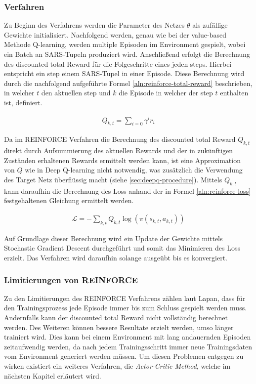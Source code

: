 \documentclass[11pt]{scrartcl}
\begin{document}
\subsubsection{Verfahren}
Zu Beginn des Verfahrens werden die Parameter des Netzes $\theta$ als zufällige Gewichte
initialisiert. Nachfolgend werden, genau wie bei der value-based Methode Q-learning, werden
multiple Episoden im Environment gespielt, wobei ein Batch an SARS-Tupeln produziert wird.
Anschließend erfolgt die Berechnung des discounted total Reward für die Folgeschritte eines
jeden steps. Hierbei entspricht ein step einem SARS-Tupel in einer Episode. Diese Berechnung
wird durch die nachfolgend aufgeführte Formel \ref{aln:reinforce-total-reward} beschrieben,
in welcher $t$ den aktuellen step und $k$ die Episode in welcher der step $t$ enthalten
ist, definiert. 

\begin{align}
Q_{k,t}=\sum_{i=0} \gamma^{i}r_{i}
\label{aln:reinforce-total-reward}
\end{align}

Da im REINFORCE Verfahren die Berechnung des discounted total Reward $Q_{k,t}$ direkt durch
Aufsummierung des aktuellen Rewards und der in zukünftigen Zuständen erhaltenen Rewards
ermittelt werden kann, ist eine Approximation von $Q$ wie in Deep Q-learning nicht notwendig,
was zusätzlich die Verwendung des Target Netz überflüssig macht (siehe 
\autoref{sec:deepq-procedure}). Mittels $Q_{k,t}$ kann daraufhin die Berechnung des Loss
anhand der in Formel \ref{aln:reinforce-loss} festgehaltenen Gleichung ermittelt werden.

\begin{align}
\mathcal{L}=-\sum_{k,t}Q_{k,t}\log(\pi(s_{k,t},a_{k,t}))
\label{aln:reinforce-loss}
\end{align}

Auf Grundlage dieser Berechnung wird ein Update der Gewichte mittels Stochastic
Gradient Descent durchgeführt und somit das Minimieren des Loss erzielt. Das Verfahren
wird daraufhin solange ausgeübt bis es konvergiert.

\subsubsection{Limitierungen von REINFORCE}
\label{sec:limit-reinforce}
Zu den Limitierungen des REINFORCE Verfahrens zählen laut Lapan\cite[~S.252]{L2018}, dass für den
Trainingsprozess jede Episode immer bis zum Schluss gespielt werden muss. Andernfalls kann der
discounted total Reward nicht vollständig berechnet werden. Des Weiteren können bessere Resultate
erzielt werden, umso länger trainiert wird. Dies kann bei einem Environment mit lang andauernden
Episoden zeitaufwendig werden, da nach jedem Trainingsschritt immer neue Trainingsdaten vom
Environment generiert werden müssen. Um diesen Problemen entgegen zu wirken existiert ein weiteres
Verfahren, die \textit{Actor-Critic Method}, welche im nächsten Kapitel erläutert wird. 
\end{document}

